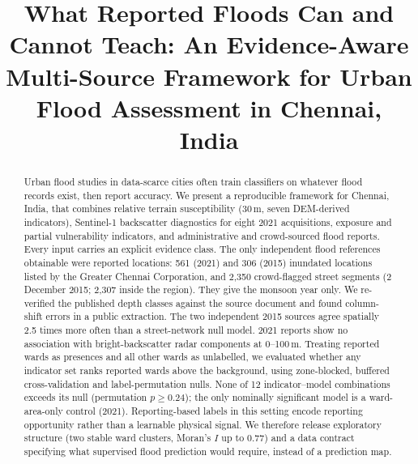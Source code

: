 \documentclass[conference]{IEEEtran}
\begin{document}
\title{What Reported Floods Can and Cannot Teach: An Evidence-Aware Multi-Source Framework for Urban Flood Assessment in Chennai, India}

\author{\IEEEauthorblockN{[Author 1]\quad [Author 2]}
\and
\IEEEauthorblockN{[Supervisor]}
\IEEEauthorblockA{[Department], [Institution]}}

\maketitle

\begin{abstract}
Urban flood studies in data-scarce cities often train classifiers on whatever flood records exist, then report accuracy. We present a reproducible framework for Chennai, India, that combines relative terrain susceptibility (30\,m, seven DEM-derived indicators), Sentinel-1 backscatter diagnostics for eight 2021 acquisitions, exposure and partial vulnerability indicators, and administrative and crowd-sourced flood reports. Every input carries an explicit evidence class. The only independent flood references obtainable were reported locations: 561 (2021) and 306 (2015) inundated locations listed by the Greater Chennai Corporation, and 2{,}350 crowd-flagged street segments (2 December 2015; 2{,}307 inside the region). They give the monsoon year only. We re-verified the published depth classes against the source document and found column-shift errors in a public extraction. The two independent 2015 sources agree spatially 2.5 times more often than a street-network null model. 2021 reports show no association with bright-backscatter radar components at 0--100\,m. Treating reported wards as presences and all other wards as unlabelled, we evaluated whether any indicator set ranks reported wards above the background, using zone-blocked, buffered cross-validation and label-permutation nulls. None of 12 indicator--model combinations exceeds its null (permutation $p \ge 0.24$); the only nominally significant model is a ward-area-only control (2021). Reporting-based labels in this setting encode reporting opportunity rather than a learnable physical signal. We therefore release exploratory structure (two stable ward clusters, Moran's $I$ up to 0.77) and a data contract specifying what supervised flood prediction would require, instead of a prediction map.
\end{abstract}
\end{document}
